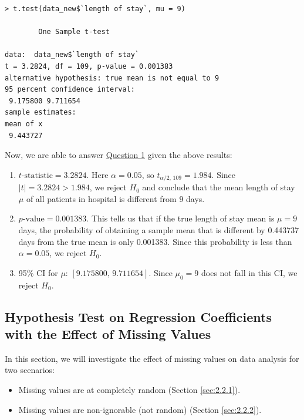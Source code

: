 \documentclass[11pt]{article}
\begin{document}
\begin{commandline}
\begin{verbatim}
> t.test(data_new$`length of stay`, mu = 9)

        One Sample t-test

data:  data_new$`length of stay`
t = 3.2824, df = 109, p-value = 0.001383
alternative hypothesis: true mean is not equal to 9
95 percent confidence interval:
 9.175800 9.711654
sample estimates:
mean of x 
 9.443727 
\end{verbatim}
\end{commandline}

Now, we are able to answer \hyperref[ques_1]{Question 1} given the above results:
\begin{enumerate}[(1)]    
    \item $t\textrm{-statistic}=3.2824$. Here $\alpha=0.05$, so $t_{\alpha/2,\, 109}=1.984$. Since $\lvert t \rvert=3.2824>1.984$, we reject $\textit{H}_0$ and conclude that the mean length of stay $\mu$ of all patients in hospital is different from $9$ days. 
    \item $p\textrm{-value}=0.001383$. This tells us that if the true length of stay mean is $\mu=9$ days, the probability of obtaining a sample mean that is different by 0.443737 days from the true mean is only 0.001383. Since this probability is less than $\alpha=0.05$, we reject $\textit{H}_0$.
    \item 95\% CI for $\mu$: $[9.175800,\, 9.711654]$. Since $\mu_{0}=9$ does not fall in this CI, we reject $\textit{H}_0$.
\end{enumerate}


\subsection{Hypothesis Test on Regression Coefficients with the Effect of Missing Values}
In this section, we will investigate the effect of missing values on data analysis for two scenarios: 

\begin{itemize}
\item Missing values are at completely random (Section \ref{sec:2.2.1}).
\item Missing values are non-ignorable (not random) (Section \ref{sec:2.2.2}).
\end{itemize}
\end{document}
